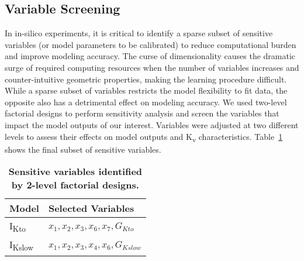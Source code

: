 \documentclass[10pt,letterpaper]{article}
\begin{document}
\subsection*{Variable Screening}
In in-silico experiments, it is critical to identify a sparse subset of sensitive variables (or model parameters to be calibrated) to reduce computational burden and improve modeling accuracy. The curse of dimensionality causes the dramatic surge of required computing resources when the number of variables increases and counter-intuitive geometric properties, making the learning procedure difficult. While a sparse subset of variables restricts the model flexibility to fit data, the opposite also has a detrimental effect on modeling accuracy. We used two-level factorial designs to perform sensitivity analysis and screen the variables that impact the model outputs of our interest. Variables were adjusted at two different levels to assess their effects on model outputs and K\textsubscript{v} characteristics. Table~\ref{table1} shows the final subset of sensitive variables.

\begin{table}
    \centering
    \caption{\bf{Sensitive variables identified by 2-level factorial designs.}}
    \begin{tabular}{ll}
        \hline
        Model & Selected Variables  \\ 
        \hline
        I\textsubscript{Kto} & $x_1, x_2, x_3, x_6, x_7, G_{Kto}$ \\
        I\textsubscript{Kslow} & $x_1, x_2, x_3, x_4, x_6, G_{Kslow}$ \\
        \hline
    \end{tabular}
    \label{table1}
\end{table}
\end{document}
